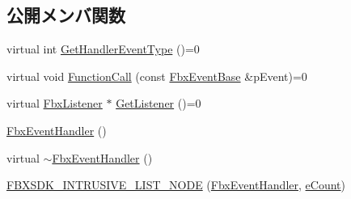 \subsection*{公開メンバ関数}
\begin{DoxyCompactItemize}
\item 
virtual int \hyperlink{class_fbx_event_handler_a0b42d2b93e63d866975f468a481c9f3c}{Get\+Handler\+Event\+Type} ()=0
\item 
virtual void \hyperlink{class_fbx_event_handler_a46357ba45116a30c8f53c3e5fe9ba2fb}{Function\+Call} (const \hyperlink{class_fbx_event_base}{Fbx\+Event\+Base} \&p\+Event)=0
\item 
virtual \hyperlink{class_fbx_listener}{Fbx\+Listener} $\ast$ \hyperlink{class_fbx_event_handler_a6d496102fe1253372bb042840c2d45a7}{Get\+Listener} ()=0
\item 
\hyperlink{class_fbx_event_handler_a275484070d5de1b461c6cca690f74e29}{Fbx\+Event\+Handler} ()
\item 
virtual \hyperlink{class_fbx_event_handler_a2b420c30f76ba3ed1c9b9937c4964293}{$\sim$\+Fbx\+Event\+Handler} ()
\item 
\hyperlink{class_fbx_event_handler_a5f41da1b9002da90f4681d9efe6d4542}{F\+B\+X\+S\+D\+K\+\_\+\+I\+N\+T\+R\+U\+S\+I\+V\+E\+\_\+\+L\+I\+S\+T\+\_\+\+N\+O\+DE} (\hyperlink{class_fbx_event_handler}{Fbx\+Event\+Handler}, \hyperlink{class_fbx_event_handler_a47139da2cfd5abee91664d75c4fb577ca2c6941dcdf691c32251fae0beabeadb2}{e\+Count})
\end{DoxyCompactItemize}


